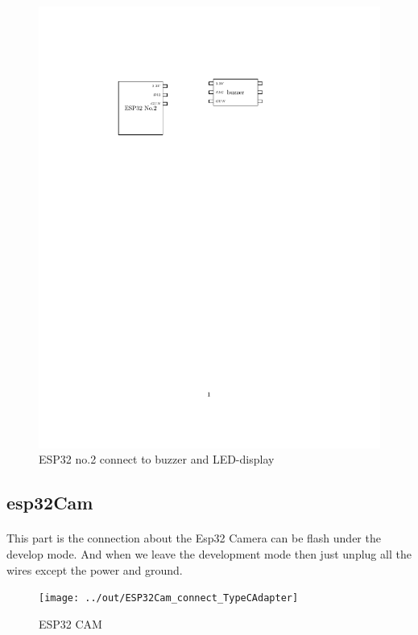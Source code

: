 \documentclass[a4paper, 12pt]{article}        %
\begin{document}
    \begin{figure}[h]
        \caption{ESP32 no.2 connect to buzzer and LED-display}\label{fig:figure3}
        \centering
        \includegraphics[width=1\textwidth]{../out/ESP32_No.2_connect_Buzzer}
    \end{figure}

    \pagebreak
    \subsection{esp32Cam}\label{subsec:esp32cam}
    \paragraph{}
    This part is the connection about the Esp32 Camera can be flash under the develop mode.
    And when we leave the development mode then just unplug all the wires except the power and ground.

    \blindtext{}

    \begin{figure}[h]
        \caption{ESP32 CAM}\label{fig:figure4}
        \centering
        \texttt{[image: ../out/ESP32Cam\_connect\_TypeCAdapter]}
    \end{figure}
\end{document}
